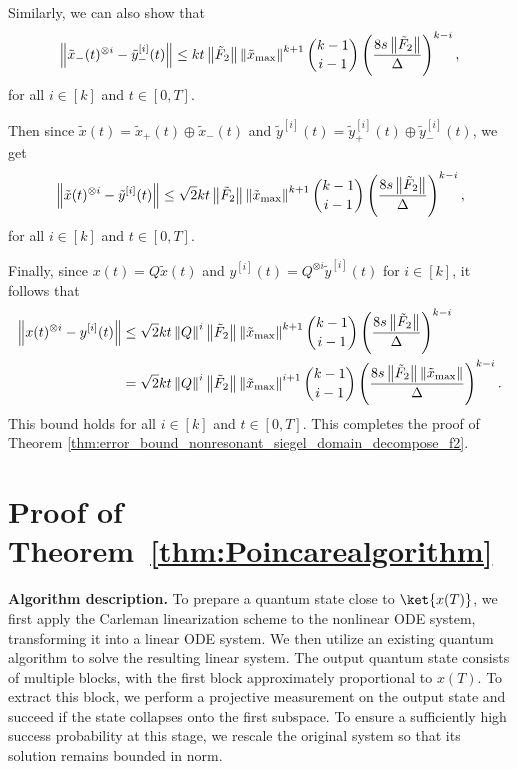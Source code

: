 \documentclass[superscriptaddress,onecolumn,nofootinbib,longbibliography,a4paper,accepted=2026-09-29]{quantumarticle}
\theoremstyle{plain}
\theoremstyle{definition}
\numberwithin{thm}{section}
\numberwithin{assumption}{section}
\numberwithin{lemma}{section}
\numberwithin{prop}{section}
\numberwithin{cor}{section}
\numberwithin{definition}{section}
\numberwithin{rmk}{section}
\numberwithin{equation}{section}
\newcommand{\norm}[1]     {\left\| #1 \right\|}
\newcommand{\lrb}[1]{\left ( #1 \right )}
\begin{document}
Similarly, we can also show that 
\begin{align}
\norm{\tilde{x}_-(t)^{\otimes i}-\tilde{y}^{[i]}_-(t)}\le  k t \norm{\tilde{F}_{2}} \norm{\tilde{x}_{\rm max}}^{k+1} \binom{k-1}{i-1} \lrb{\frac{8 s\norm{\tilde{F}_{2}} }{\Delta}}^{k-i},
\end{align}
for all $i \in [k]$ and $t \in [0, T]$.

Then since $\tilde{x}(t)=\tilde{x}_+(t) \oplus \tilde{x}_-(t)$
and $\tilde{y}^{[i]}(t)=\tilde{y}^{[i]}_+(t) \oplus \tilde{y}^{[i]}_-(t)$, we get
\begin{align}
\norm{\tilde{x}(t)^{\otimes i}-\tilde{y}^{[i]}(t)}\le \sqrt{2} k t  \norm{\tilde{F}_{2}} \norm{\tilde{x}_{\rm max}}^{k+1} \binom{k-1}{i-1} \lrb{\frac{8 s\norm{\tilde{F}_{2}} }{\Delta}}^{k-i},
\end{align}
for all $i \in [k]$ and $t \in [0, T]$.

Finally, since $x(t)=Q \tilde{x}(t)$ and $y^{[i]}(t) =Q^{\otimes i} \tilde{y}^{[i]}(t)$ for $i \in [k]$, it follows that
\begin{align}
\norm{{x}(t)^{\otimes i}-{y}^{[i]}(t)}& \le \sqrt{2} k t  \norm{Q}^i \norm{\tilde{F}_{2}} \norm{\tilde{x}_{\rm max}}^{k+1} \binom{k-1}{i-1} \lrb{\frac{8 s\norm{\tilde{F}_{2}} }{\Delta}}^{k-i} \\ 
&= \sqrt{2} k t  \norm{Q}^i \norm{\tilde{F}_{2}} \norm{\tilde{x}_{\rm max}}^{i+1} \binom{k-1}{i-1} \lrb{\frac{8 s\norm{\tilde{F}_{2}} \norm{\tilde{x}_{\rm max}}}{\Delta}}^{k-i}.
\end{align}
This bound holds for all $i \in [k]$ and $t \in [0, T]$. This completes the proof of Theorem \ref{thm:error_bound_nonresonant_siegel_domain_decompose_f2}.
    

\section{Proof of Theorem~\ref{thm:Poincarealgorithm}}
\label{app:poincare_domain_algorithm}

\noindent\textbf{Algorithm description.}
To prepare a quantum state close to $\ket{x(T)}$, we first apply the Carleman linearization scheme to the nonlinear ODE system, transforming it into a linear ODE system. We then utilize an existing quantum algorithm to solve the resulting linear system. The output quantum state consists of multiple blocks, with the first block approximately proportional to $x(T)$. To extract this block, we perform a projective measurement on the output state and succeed if the state collapses onto the first subspace. To ensure a sufficiently high success probability at this stage, we rescale the original system so that its solution remains bounded in norm.
\end{document}

